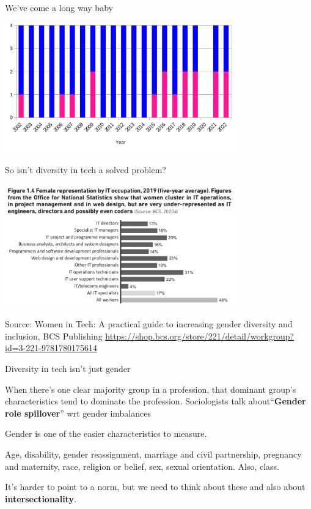 \documentclass[xcolor=table,aspectratio=169]{beamer}
\begin{document}
\begin{frame}{We've come a long way baby}

	\includegraphics[width=10cm]{accu_key.png}
\end{frame}
\begin{frame}{So isn't diversity in tech a solved problem?}

	\includegraphics[width=10cm]{it_profession_gender.png}

	\tiny{Source: Women in Tech: A practical guide to increasing gender diversity and inclusion, BCS Publishing \url{https://shop.bcs.org/store/221/detail/workgroup?id=3-221-9781780175614}}
\end{frame}

\begin{frame}{Diversity in tech isn't just gender}

	When there's one clear majority group in a profession, that dominant group's characteristics tend to dominate the profession.  Sociologists talk about``\textbf{Gender role spillover}''  wrt gender imbalances


	\vspace{0.5em}

	Gender is one of the easier characteristics to measure.  	

	\vspace{0.5em}

	Age, disability, gender reassignment, marriage and civil partnership, pregnancy and maternity, race, religion or belief, sex, sexual orientation. Also, class. 


	\vspace{0.5em}


	It's harder to point to a norm, but we need to think about these and also about \textbf{intersectionality}.

\end{frame}
\end{document}
